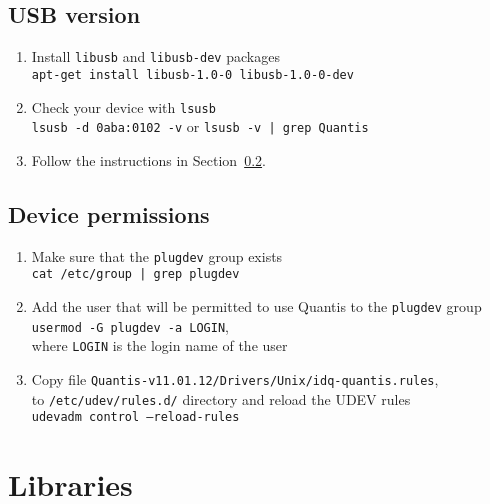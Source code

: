 \documentclass[a4paper,11pt]{article}
\begin{document}
\subsection{USB version}
\begin{enumerate}
    \item Install \texttt{libusb} and \texttt{libusb-dev} packages\\ 
    \texttt{apt-get install libusb-1.0-0 libusb-1.0-0-dev}
    \item Check your device with \texttt{lsusb}\\
    \texttt{lsusb -d 0aba:0102 -v} or \texttt{lsusb -v | grep Quantis}
    \item Follow the instructions in Section~\ref{sec:permissions}.
\end{enumerate}


\subsection{Device permissions}\label{sec:permissions}
\begin{enumerate}
    \item Make sure that the \texttt{plugdev} group exists\\
    \texttt{cat /etc/group | grep plugdev}
    \item Add the user that will be permitted to use Quantis to the
    \texttt{plugdev} group\\ \texttt{usermod -G plugdev -a LOGIN},\\ where
    \texttt{LOGIN} is the login name of the user
    \item Copy file \texttt{Quantis-v11.01.12/Drivers/Unix/idq-quantis.rules},\\
    to \texttt{/etc/udev/rules.d/} directory and reload the UDEV rules\\
    \texttt{udevadm control --reload-rules}
\end{enumerate}

\section{Libraries}
\end{document}
